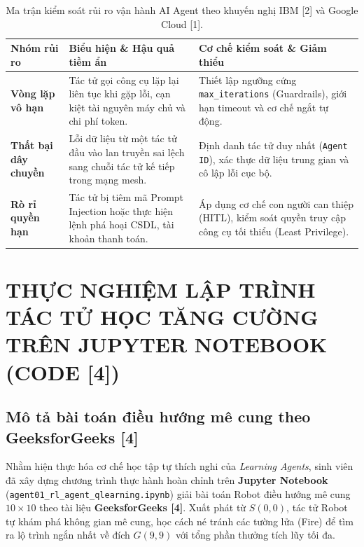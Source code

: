 \documentclass[12pt,a4paper]{article}
\begin{document}
\begin{table}[H]
\centering
\caption{Ma trận kiểm soát rủi ro vận hành AI Agent theo khuyến nghị IBM [2] và Google Cloud [1].}
\label{tab:risk_matrix}
\small
\begin{tabularx}{\textwidth}{@{} l X X @{}}
\toprule
\textbf{Nhóm rủi ro} & \textbf{Biểu hiện \& Hậu quả tiềm ẩn} & \textbf{Cơ chế kiểm soát \& Giảm thiểu} \\
\midrule
\textbf{Vòng lặp vô hạn} & Tác tử gọi công cụ lặp lại liên tục khi gặp lỗi, cạn kiệt tài nguyên máy chủ và chi phí token. & Thiết lập ngưỡng cứng \texttt{max\_iterations} (Guardrails), giới hạn timeout và cơ chế ngắt tự động. \\
\addlinespace[2pt]
\textbf{Thất bại dây chuyền} & Lỗi dữ liệu từ một tác tử đầu vào lan truyền sai lệch sang chuỗi tác tử kế tiếp trong mạng mesh. & Định danh tác tử duy nhất (\texttt{Agent ID}), xác thực dữ liệu trung gian và cô lập lỗi cục bộ. \\
\addlinespace[2pt]
\textbf{Rò rỉ quyền hạn} & Tác tử bị tiêm mã Prompt Injection hoặc thực hiện lệnh phá hoại CSDL, tài khoản thanh toán. & Áp dụng cơ chế con người can thiệp (HITL), kiểm soát quyền truy cập công cụ tối thiểu (Least Privilege). \\
\bottomrule
\end{tabularx}
\end{table}

\clearpage


\section{THỰC NGHIỆM LẬP TRÌNH TÁC TỬ HỌC TĂNG CƯỜNG TRÊN JUPYTER NOTEBOOK (CODE [4])}

\subsection{Mô tả bài toán điều hướng mê cung theo GeeksforGeeks [4]}
Nhằm hiện thực hóa cơ chế học tập tự thích nghi của \textit{Learning Agents}, sinh viên đã xây dựng chương trình thực hành hoàn chỉnh trên \textbf{Jupyter Notebook} (\texttt{agent01\_rl\_agent\_qlearning.ipynb}) giải bài toán Robot điều hướng mê cung $10 \times 10$ theo tài liệu \textbf{GeeksforGeeks [4]}. Xuất phát từ $S(0, 0)$, tác tử Robot tự khám phá không gian mê cung, học cách né tránh các tường lửa (Fire) để tìm ra lộ trình ngắn nhất về đích $G(9, 9)$ với tổng phần thưởng tích lũy tối đa.
\end{document}
